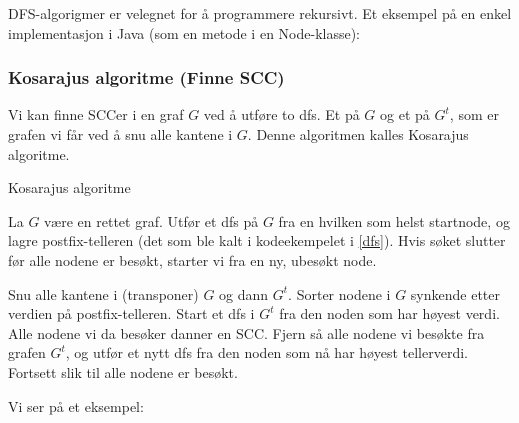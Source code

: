 DFS-algorigmer er velegnet for å programmere rekursivt. Et eksempel på en enkel implementasjon i Java (som en metode i en Node-klasse):



\subsubsection{Kosarajus algoritme (Finne SCC)}
Vi kan finne SCCer i en graf $ G $ ved å utføre to dfs. Et på $ G $ og et på $ G^t $, som er grafen vi får ved å snu alle kantene i $ G $. Denne algoritmen kalles Kosarajus algoritme.

\begin{theorem} Kosarajus algoritme

La $ G $ være en rettet graf. Utfør et dfs på $ G $ fra en hvilken som helst startnode, og lagre postfix-telleren (det som ble kalt  i kodeekempelet i \ref{dfs}). Hvis søket slutter før alle nodene er besøkt, starter vi fra en ny, ubesøkt node.

Snu alle kantene i (transponer) $ G $ og dann $ G^t $. Sorter nodene i $ G $ synkende etter verdien på postfix-telleren. Start et dfs i $ G^t $ fra den noden som har høyest verdi. Alle nodene vi da besøker danner en SCC. Fjern så alle nodene vi besøkte fra grafen $ G^t $, og utfør et nytt dfs fra den noden som nå har høyest tellerverdi. Fortsett slik til alle nodene er besøkt. 
\end{theorem}


\noindent Vi ser på et eksempel:

